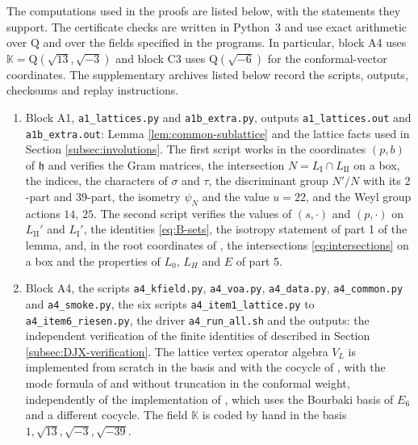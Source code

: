 \documentclass[leqno]{article}
\newcommand{\K}{\ensuremath{\mathbb{K}}}
\newcommand{\Q}{\mathrm{Q}}
\numberwithin{equation}{section}
\begin{document}
The computations used in the proofs are listed below, with the statements they support. The certificate checks are written in Python~3 and use exact arithmetic over $\Q$ and over the fields specified in the programs. In particular, block A4 uses $\K = \Q(\sqrt{13},\sqrt{-3})$ and block C3 uses $\Q(\sqrt{-6})$ for the conformal-vector coordinates. The supplementary archives listed below record the scripts, outputs, checksums and replay instructions.
\begin{enumerate}
\item Block A1, \nolinkurl{a1_lattices.py} and \nolinkurl{a1b_extra.py}, outputs \nolinkurl{a1_lattices.out} and \nolinkurl{a1b_extra.out}: Lemma \ref{lem:common-sublattice} and the lattice facts used in Section \ref{subsec:involutions}. The first script works in the coordinates $(p,b)$ of $\mathfrak h$ and verifies the Gram matrices, the intersection $N = L_{\mathrm I} \cap L_{\mathrm{II}}$ on a box, the indices, the characters of $\sigma$ and $\tau$, the discriminant group $N'/N$ with its $2$-part and $39$-part, the isometry $\psi_N$ and the value $u = 22$, and the Weyl group actions $14$, $25$. The second script verifies the values of $(s,\cdot)$ and $(p,\cdot)$ on $L_{\mathrm{II}}'$ and $L_{\mathrm I}'$, the identities \eqref{eq:B-sets}, the isotropy statement of part 1 of the lemma, and, in the root coordinates of \cite[(4.1)]{DJX26}, the intersections \eqref{eq:intersections} on a box and the properties of $L_0$, $L_H$ and $E$ of part 5.
\item Block A4, the scripts \nolinkurl{a4_kfield.py}, \nolinkurl{a4_voa.py}, \nolinkurl{a4_data.py}, \nolinkurl{a4_common.py} and \nolinkurl{a4_smoke.py}, the six scripts \nolinkurl{a4_item1_lattice.py} to \nolinkurl{a4_item6_riesen.py}, the driver \nolinkurl{a4_run_all.sh} and the outputs: the independent verification of the finite identities of \cite{DJX26} described in Section \ref{subsec:DJX-verification}. The lattice vertex operator algebra $V_L$ is implemented from scratch in the basis and with the cocycle of \cite[Section 4]{DJX26}, with the mode formula of \cite[Appendix A]{DJX26} and without truncation in the conformal weight, independently of the implementation of \cite{Arh26}, which uses the Bourbaki basis of $E_6$ and a different cocycle. The field $\K$ is coded by hand in the basis $1, \sqrt{13}, \sqrt{-3}, \sqrt{-39}$.

\end{enumerate}
\end{document}
